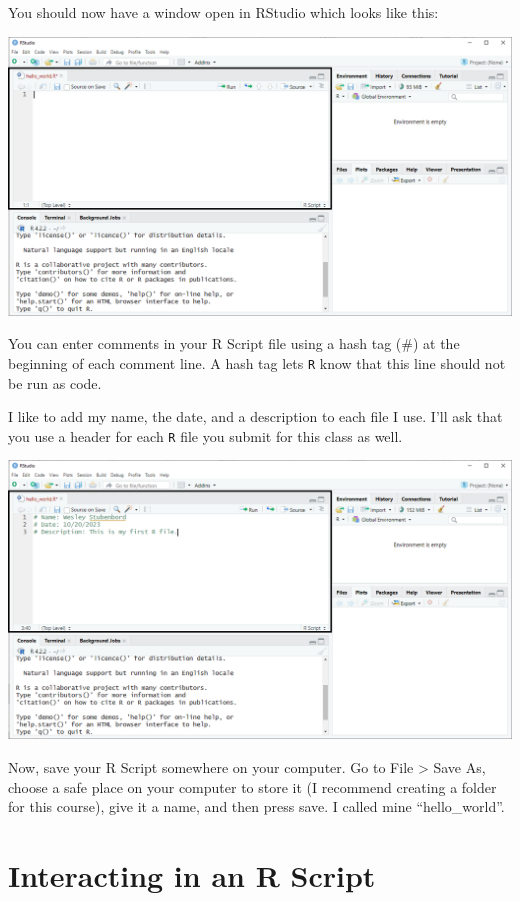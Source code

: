 \documentclass[
]{book}
\begin{document}
You should now have a window open in RStudio which looks like this:

\includegraphics{docs/_main_files/figure-html/RStudio_Opened RScript.png}

You can enter comments in your R Script file using a hash tag (\#) at the beginning of each comment line. A hash tag lets \texttt{R} know that this line should not be run as code.

I like to add my name, the date, and a description to each file I use. I'll ask that you use a header for each \texttt{R} file you submit for this class as well.

\includegraphics{docs/_main_files/figure-html/RStudio_Commenting in an R Script file.png}

Now, save your R Script somewhere on your computer. Go to File \textgreater{} Save As, choose a safe place on your computer to store it (I recommend creating a folder for this course), give it a name, and then press save. I called mine ``hello\_world''.

\hypertarget{interacting-in-an-r-script}{%
\section{Interacting in an R Script}\label{interacting-in-an-r-script}}
\end{document}
